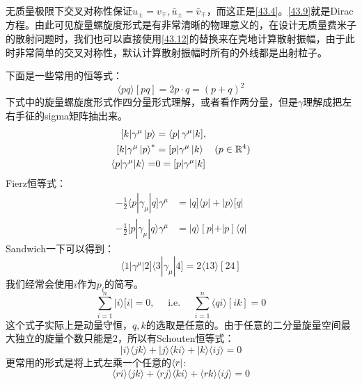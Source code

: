 无质量极限下交叉对称性保证$u_\pm=v_\mp,\bar u_\pm =\bar v_\mp$，而这正是\ref{43.4}。\ref{43.9}就是Dirac方程。由此可见旋量螺旋度形式是有非常清晰的物理意义的，在设计无质量费米子的散射问题时，我们也可以直接使用\ref{43.12}的替换来在壳地计算散射振幅，由于此时非常简单的交叉对称性，默认计算散射振幅时所有的外线都是出射粒子。

下面是一些常用的恒等式：
\begin{equation}
	\langle p q\rangle[p q]=2p\cdot q=(p+q)^2
\end{equation}
下式中的旋量螺旋度形式作四分量形式理解，或者看作两分量，但是$\gamma$理解成把左右手征的sigma矩阵抽出来。
\begin{equation}
	\begin{aligned}
		[k|\gamma^\mu\ket{p}&=\bra{p}\gamma^\mu|k],\\ [k|\gamma^\mu\ket{p}^*&=[p|\gamma^\mu\ket{k}\quad\text{($p\in\mathbb{R}^4$)}\\
		\langle p|\gamma^\mu|k\rangle=&0=[p|\gamma^\mu|k]
	\end{aligned}
\end{equation}
Fierz恒等式：
\begin{equation}
	\begin{aligned}-\frac12\langle p|\gamma_\mu|q]\gamma^\mu&=|q]\langle p|+|p\rangle[q|\\[2ex]-\frac12[p|\gamma_\mu|q\rangle\gamma^\mu&=|q\rangle[p|+|p]\langle q|\end{aligned}
\end{equation}
Sandwich一下可以得到：
\begin{equation}
	\langle1|\gamma^\mu|2]\langle3|\gamma_\mu|4]=2\langle13\rangle[24]
\end{equation}
我们经常会使用$i$作为$p_i$的简写。
\begin{equation}
	\sum_{i=1}^n|i\rangle[i|=0,\quad\text{ i.e. }\quad\sum_{i=1}^n\langle qi\rangle[ik]=0
\end{equation}
这个式子实际上是动量守恒，$q,k$的选取是任意的。由于任意的二分量旋量空间最大独立的旋量个数只能是2，所以有Schouten恒等式：
\begin{equation}
	|i\rangle\langle jk\rangle+|j\rangle\langle ki\rangle+|k\rangle\langle ij\rangle=0
\end{equation}
更常用的形式是将上式左乘一个任意的$\bra{r}$:
\begin{equation}
	\langle ri\rangle\langle jk\rangle+\langle rj\rangle\langle ki\rangle+\langle rk\rangle\langle ij\rangle=0
\end{equation}
